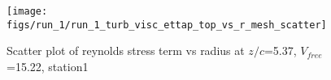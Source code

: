 \begin{figure}[H]
\centering
\texttt{[image: figs/run\_1/run\_1\_turb\_visc\_ettap\_top\_vs\_r\_mesh\_scatter]}
\caption{Scatter plot of reynolds stress term vs radius at $z/c$=5.37, $V_{free}$=15.22, station1}
\label{fig:run_1_turb_visc_ettap_top_vs_r_mesh_scatter}
\end{figure}


